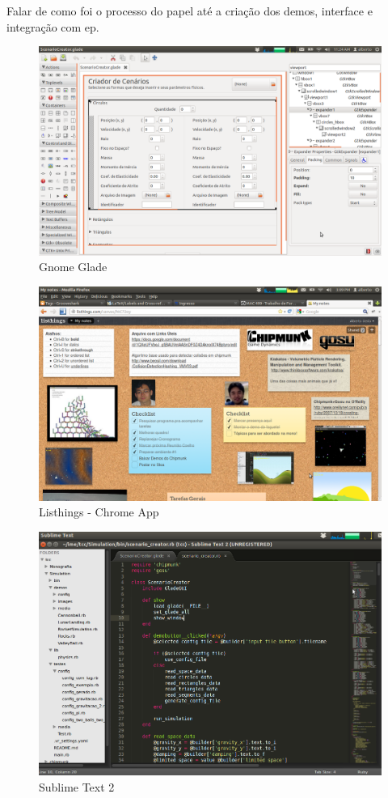 Falar de como foi o processo do papel até a criação dos demos, interface e integração com ep.

\begin{figure}
	\centering
	\caption{Gnome Glade}
	\includegraphics[scale=0.3]{images/glade.png}
	\hspace{0.5cm}
\end{figure}

\begin{figure}
	\centering
	\caption{Listhings - Chrome App}
	\includegraphics[scale=0.3]{images/listhings.png}
	\hspace{0.5cm}
\end{figure}

\begin{figure}
	\centering
	\caption{Sublime Text 2}
	\includegraphics[scale=0.3]{images/sublime-text-2.png}
	\hspace{0.5cm}
\end{figure}





